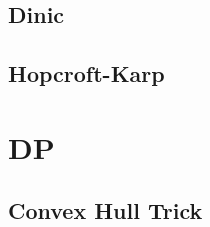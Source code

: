 \documentclass[10pt, a4paper]{article}
\begin{document}
\subsection{Dinic}


\subsection{Hopcroft-Karp}


% 



\section{DP}

\subsection{Convex Hull Trick}


% 
\end{document}
